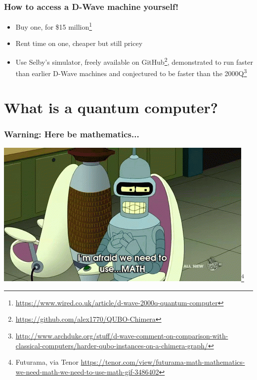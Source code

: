\documentclass[]{beamer}
\begin{document}
\begin{frame}
\begin{center}
\end{center}
\end{frame}


\begin{frame}
\frametitle{How to access a D-Wave machine yourself!}

\begin{itemize}
\item<1-> Buy one, for \$15 million\footnote{\url{https://www.wired.co.uk/article/d-wave-2000q-quantum-computer}}
\item<2-> Rent time on one, cheaper but still pricey
\item<3-> Use Selby's simulator, freely available on GitHub\footnote{\url{https://github.com/alex1770/QUBO-Chimera}}, demonstrated to run faster than earlier D-Wave machines and conjectured to be faster than the 2000Q\footnote{\url{http://www.archduke.org/stuff/d-wave-comment-on-comparison-with-classical-computers/harder-qubo-instances-on-a-chimera-graph/}}
\end{itemize}
\end{frame}

\section{What is a quantum computer?}

\begin{frame}
\frametitle{Warning: Here be  mathematics...}

\begin{center}
\includegraphics[scale=0.9]{math}\footnote{Futurama, via Tenor \url{https://tenor.com/view/futurama-math-mathematics-we-need-math-we-need-to-use-math-gif-3486402}}
\end{center}

\end{frame}
\end{document}
